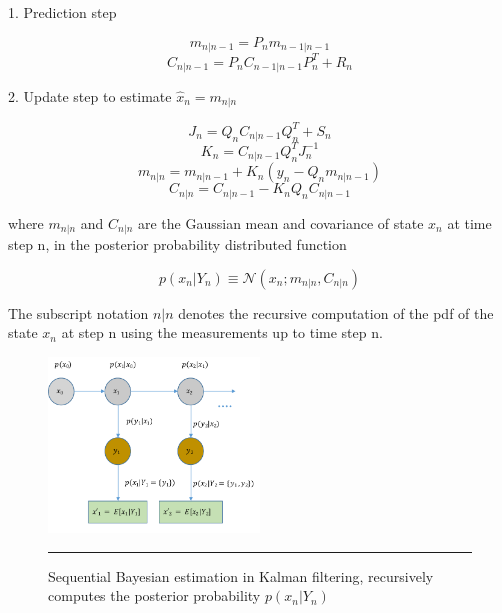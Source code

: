         1. Prediction step

        \begin{equation} m_{n|n-1} = P_{n}m_{n-1|n-1} \end{equation}
        \begin{equation} C_{n|n-1} = P_{n}C_{n-1|n-1}P^{T}_{n} + R_{n} \end{equation}

        2. Update step to estimate $\hat{x}_{n} = m_{n|n}$

        \begin{equation} J_{n} = Q_{n}C_{n|n-1}Q^{T}_{n} + S_{n} \end{equation}
        \begin{equation} K_{n} = C_{n|n-1}Q^{T}_{n}J^{-1}_{n} \end{equation}
        \begin{equation} m_{n|n} = m_{n|n-1} + K_{n}(y_{n} - Q_{n}m_{n|n-1}) \end{equation}
        \begin{equation} C_{n|n} = C_{n|n-1} - K_{n}Q_{n}C_{n|n-1} \end{equation}

where $m_{n|n}$ and $C_{n|n}$ are the Gaussian mean and covariance of state $x_{n}$ at time step n,
in the posterior probability distributed function

        \begin{equation} p(x_{n}|Y_{n}) \equiv \mathcal{N}(x_{n};m_{n|n},C_{n|n}) \end{equation}

The subscript notation $n|n$ denotes the recursive computation of the pdf of the state $x_{n}$ at
step n using the measurements up to time step n.

\begin{figure}[htbp]
  \centering
    \includegraphics[width=0.5\textwidth,height=0.5\textheight,keepaspectratio]{Figures/kalman-filter.pdf}
    \rule{35em}{0.5pt}
  \caption[Sequential Bayesian estimation in Kalman filtering]{Sequential Bayesian estimation in
  Kalman filtering, recursively computes the posterior probability $p(x_{n}|Y_{n})$}
  \label{fig:kalman-filter}
\end{figure}

